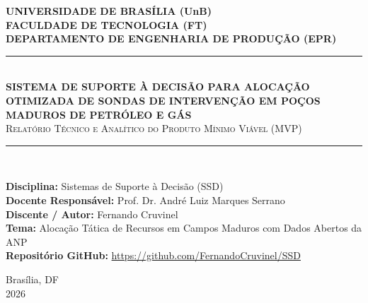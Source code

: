 \documentclass[12pt,a4paper]{article}
\begin{document}
\begin{titlepage}
    \begin{center}
        \vspace*{0.5cm}
        {\Large \textbf{UNIVERSIDADE DE BRASÍLIA (UnB)}}\\[0.3cm]
        {\large \textbf{FACULDADE DE TECNOLOGIA (FT)}}\\[0.3cm]
        {\large \textbf{DEPARTAMENTO DE ENGENHARIA DE PRODUÇÃO (EPR)}}\\[3.5cm]
        
        \rule{\textwidth}{1.5pt}\\[0.5cm]
        {\Large \textbf{\textcolor{unbblue}{SISTEMA DE SUPORTE À DECISÃO PARA ALOCAÇÃO OTIMIZADA DE SONDAS DE INTERVENÇÃO EM POÇOS MADUROS DE PETRÓLEO E GÁS}}}\\[0.2cm]
        {\large \textsc{Relatório Técnico e Analítico do Produto Mínimo Viável (MVP)}}\\[0.3cm]
        \rule{\textwidth}{1.5pt}\\[3cm]
        
        \begin{flushright}
            \begin{minipage}{0.58\textwidth}
                \textbf{Disciplina:} Sistemas de Suporte à Decisão (SSD)\\
                \textbf{Docente Responsável:} Prof. Dr. André Luiz Marques Serrano\\
                \textbf{Discente / Autor:} Fernando Cruvinel\\
                \textbf{Tema:} Alocação Tática de Recursos em Campos Maduros com Dados Abertos da ANP\\
                \textbf{Repositório GitHub:} \url{https://github.com/FernandoCruvinel/SSD}
            \end{minipage}
        \end{flushright}
        
        \vfill
        {\large Brasília, DF}\\
        {\large 2026}
    \end{center}
\end{titlepage}

\end{document}
